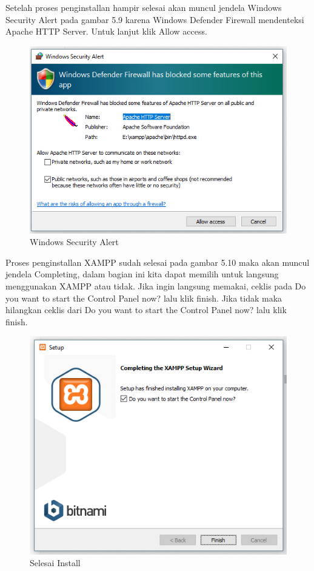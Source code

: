 Setelah proses penginstallan hampir selesai akan muncul jendela Windows Security Alert pada gambar 5.9 karena Windows Defender Firewall mendenteksi Apache HTTP Server. Untuk lanjut klik Allow access.

\begin{figure}[h]
\centering
\includegraphics[scale=0.5]{figures/windowssecurityalert}
\caption{Windows Security Alert}
\end{figure}

Proses penginstallan XAMPP sudah selesai pada gambar 5.10 maka akan muncul jendela Completing, dalam bagian ini kita dapat memilih untuk langsung menggunakan XAMPP atau tidak. Jika ingin langsung memakai, ceklis pada Do you want to start the Control Panel now? lalu klik finish. Jika tidak maka hilangkan ceklis dari  Do you want to start the Control Panel now? lalu klik finish.

\begin{figure}[h]
\centering
\includegraphics[scale=0.5]{figures/selesaiinstall}
\caption{Selesai Install}
\end{figure}




